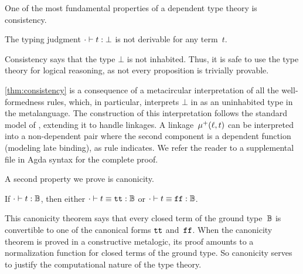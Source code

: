 One of the most fundamental properties of a dependent type theory is consistency.
\begin{theorem}[Consistency]
\label{thm:consistency}
  The typing judgment $ {\cdot} \vdash {t} : {\bot} $ is not derivable for any term~$t$.
\end{theorem}

\noindent
Consistency says that the type $\bot$ is not inhabited.
Thus, it is safe to use the type theory for logical reasoning, as not
every proposition is trivially provable.

\cref{thm:consistency} is a consequence of a meta\-circular interpretation of all
the well-formedness rules, which, in particular, interprets $\bot$ in
\TT as an uninhabited type in the meta\-language.
The construction of this interpretation follows the standard model of
\citet{altkap2016}, extending it to handle linkages.
A linkage~$\mu^+({\ell},{t})$ can be interpreted into a non-dependent pair where the
second component is a dependent function (modeling late binding),
as rule  indicates.
%
We refer the reader to a supplemental file in Agda syntax for the complete proof.


A second property we prove is canonicity.

\begin{theorem}[Canonicity]
\label{thm:canonicity}
  If $ {\cdot} \vdash {t} : {\mathbb{B}} $, then either $ {\cdot} \vdash {t \equiv \ensuremath{\texttt{tt}}} : {\mathbb{B}} $ or $ {\cdot} \vdash {t \equiv \ensuremath{\texttt{ff}}} : {\mathbb{B}} $.
\end{theorem}

\noindent
This canonicity theorem says that every closed term of the ground
type~$\mathbb{B}$ is convertible to one of the canonical forms $\texttt{tt}$ and~$\texttt{ff}$.
When the canonicity theorem is proved in a constructive meta\-logic, its proof
amounts to a normalization function for closed terms of the ground type.
So canonicity serves to justify the computational nature of the type theory.

